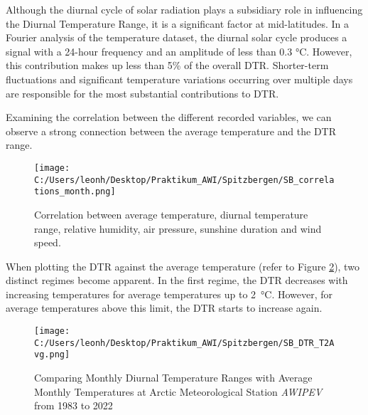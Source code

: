 Although the diurnal cycle of solar radiation plays a subsidiary role in influencing the Diurnal Temperature Range, it is a significant factor at mid-latitudes.
In a Fourier analysis of the temperature dataset, the diurnal solar cycle produces a signal with a 24-hour frequency and an amplitude of less than 0.3 °C. However, this contribution makes up less than 5\% of the overall DTR. Shorter-term fluctuations and significant temperature variations occurring over multiple days are responsible for the most substantial contributions to DTR.

Examining the correlation between the different recorded variables, we can observe a strong connection between the average temperature and the DTR range.

\begin{figure}[ht]
    \centering
    \texttt{[image: C:/Users/leonh/Desktop/Praktikum\_AWI/Spitzbergen/SB\_correlations\_month.png]}
    \caption{Correlation between average temperature, diurnal temperature range, relative humidity, air pressure, sunshine duration and wind speed.}
    \label{fi:correlationMonth_SB}
\end{figure}

When plotting the DTR against the average temperature (refer to Figure \ref{fig:SB_DTR_Month_scatterd}), two distinct regimes become apparent. In the first regime, the DTR decreases with increasing temperatures for average temperatures up to \SI{2}{\celsius}. However, for average temperatures above this limit, the DTR starts to increase again.

\begin{figure}[ht]
    \centering
    \texttt{[image: C:/Users/leonh/Desktop/Praktikum\_AWI/Spitzbergen/SB\_DTR\_T2Avg.png]}
    \caption{Comparing Monthly Diurnal Temperature Ranges with Average Monthly Temperatures at Arctic Meteorological Station \textit{AWIPEV} from 1983 to 2022}
    \label{fig:SB_DTR_Month_scatterd}
\end{figure}

